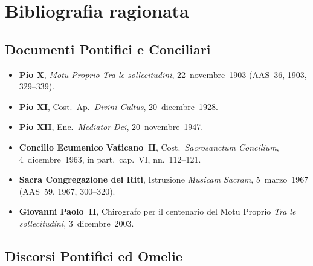 \documentclass[12pt,a4paper]{article}
\begin{document}
	\section{Bibliografia ragionata}
	
	\subsection*{Documenti Pontifici e Conciliari}
	
	\begin{itemize}[leftmargin=*]
		\item \textbf{Pio X}, \emph{Motu Proprio Tra le sollecitudini},
		22~novembre~1903 (AAS~36, 1903, 329--339).
		\item \textbf{Pio XI}, Cost.~Ap.\ \emph{Divini Cultus}, 20~dicembre~1928.
		\item \textbf{Pio XII}, Enc.\ \emph{Mediator Dei}, 20~novembre~1947.
		\item \textbf{Concilio Ecumenico Vaticano~II}, Cost.\ \emph{Sacrosanctum
			Concilium}, 4~dicembre~1963, in part.\ cap.~VI, nn.~112--121.
		\item \textbf{Sacra Congregazione dei Riti}, Istruzione \emph{Musicam Sacram},
		5~marzo~1967 (AAS~59, 1967, 300--320).
		\item \textbf{Giovanni Paolo~II}, Chirografo per il centenario del Motu
		Proprio \emph{Tra le sollecitudini}, 3~dicembre~2003.
	\end{itemize}
	
	\subsection*{Discorsi Pontifici ed Omelie}
	
\end{document}
